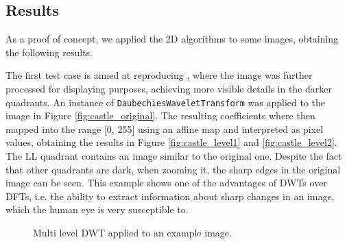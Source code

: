 \subsection{Results}
As a proof of concept, we applied the 2D algorithms to some images, obtaining the following results.

The first test case is aimed at reproducing \cite{castle}, where the image was further processed for displaying purposes, achieving more visible details in the darker quadrants. An instance of \texttt{Daubechies\-Wavelet\-Transform} was applied to the image in Figure \ref{fig:castle_original}. The resulting coefficients where then mapped into the range [0, 255] using an affine map and interpreted as pixel values, obtaining the results in Figure \ref{fig:castle_level1} and \ref{fig:castle_level2}. The LL quadrant contains an image similar to the original one. Despite the fact that other quadrants are dark, when zooming it, the sharp edges in the original image can be seen. This example shows one of the advantages of DWTs over DFTs, i.e. the ability to extract information about sharp changes in an image, which the human eye is very susceptible to.

\begin{figure}[h]
    \centering
    \caption{Multi level DWT applied to an example image.}
    \label{fig:wavelet_2d}
\end{figure}

